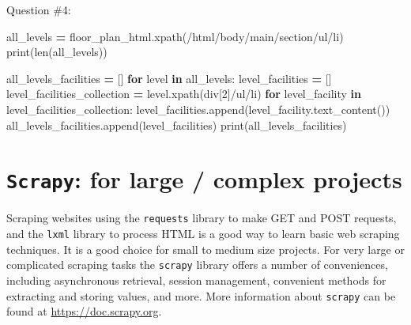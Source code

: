 \documentclass[
]{book}
\newenvironment{Shaded}{\begin{snugshade}}{\end{snugshade}}
\newcommand{\BuiltInTok}[1]{#1}
\newcommand{\ControlFlowTok}[1]{\textcolor[rgb]{0.13,0.29,0.53}{\textbf{#1}}}
\newcommand{\KeywordTok}[1]{\textcolor[rgb]{0.13,0.29,0.53}{\textbf{#1}}}
\newcommand{\NormalTok}[1]{#1}
\newcommand{\OperatorTok}[1]{\textcolor[rgb]{0.81,0.36,0.00}{\textbf{#1}}}
\newcommand{\StringTok}[1]{\textcolor[rgb]{0.31,0.60,0.02}{#1}}
\begin{document}
\begin{alert}
Question \#4:

\begin{Shaded}
\begin{Highlighting}[]
\NormalTok{all\_levels }\OperatorTok{=}\NormalTok{ floor\_plan\_html.xpath(}\StringTok{\textquotesingle{}/html/body/main/section/ul/li\textquotesingle{}}\NormalTok{)}
\BuiltInTok{print}\NormalTok{(}\BuiltInTok{len}\NormalTok{(all\_levels))}
\end{Highlighting}
\end{Shaded}

\begin{Shaded}
\begin{Highlighting}[]
\NormalTok{all\_levels\_facilities }\OperatorTok{=}\NormalTok{ []}
\ControlFlowTok{for}\NormalTok{ level }\KeywordTok{in}\NormalTok{ all\_levels:}
\NormalTok{    level\_facilities }\OperatorTok{=}\NormalTok{ []}
\NormalTok{    level\_facilities\_collection }\OperatorTok{=}\NormalTok{ level.xpath(}\StringTok{\textquotesingle{}div[2]/ul/li\textquotesingle{}}\NormalTok{)}
    \ControlFlowTok{for}\NormalTok{ level\_facility }\KeywordTok{in}\NormalTok{ level\_facilities\_collection:}
\NormalTok{        level\_facilities.append(level\_facility.text\_content())}
\NormalTok{    all\_levels\_facilities.append(level\_facilities)}
\BuiltInTok{print}\NormalTok{(all\_levels\_facilities)}
\end{Highlighting}
\end{Shaded}

\end{alert}

\hypertarget{scrapy-for-large-complex-projects}{%
\section{\texorpdfstring{\texttt{Scrapy}: for large / complex projects}{Scrapy: for large / complex projects}}\label{scrapy-for-large-complex-projects}}

Scraping websites using the \texttt{requests} library to make GET and POST requests, and the \texttt{lxml} library to process HTML is a good way to learn basic web scraping techniques. It is a good choice for small to medium size projects. For very large or complicated scraping tasks the \texttt{scrapy} library offers a number of conveniences, including asynchronous retrieval, session management, convenient methods for extracting and storing values, and more. More information about \texttt{scrapy} can be found at \url{https://doc.scrapy.org}.
\end{document}
